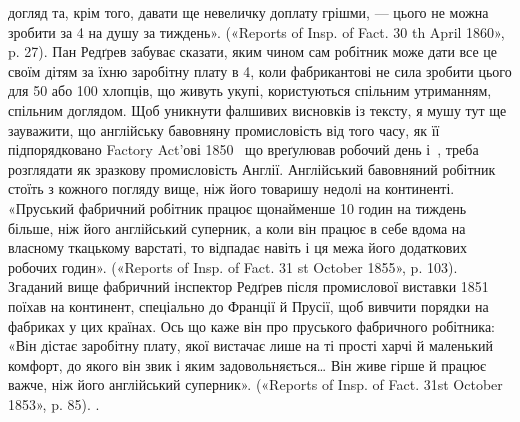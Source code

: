 {догляд та, крім того, давати ще невеличку доплату грішми, — цього
не можна зробити за 4 на душу за тиждень». («Reports of Insp.
of Fact. 30 th April 1860», p. 27). Пан Редґрев забуває сказати, яким
чином сам робітник може дати все це своїм дітям за їхню заробітну плату
в 4, коли фабрикантові не сила зробити цього для 50 або 100
хлопців, що живуть укупі, користуються спільним утриманням, спільним
доглядом. Щоб уникнути фалшивих висновків із тексту, я мушу тут ще
зауважити, що англійську бавовняну промисловість від того часу, як
її підпорядковано Factory Act’ові 1850~ що вреґулював робочий день
і~, треба розглядати як зразкову промисловість Англії. Англійський
бавовняний робітник стоїть з кожного погляду вище, ніж його товаришу
недолі на континенті. «Пруський фабричний робітник працює щонайменше
10 годин на тиждень більше, ніж його англійський суперник, а коли він
працює в себе вдома на власному ткацькому варстаті, то відпадає навіть
і ця межа його додаткових робочих годин». («Reports of Insp. of Fact.
31 st October 1855», p. 103). Згаданий вище фабричний інспектор Редґрев
після промислової виставки 1851~ поїхав на континент, спеціально до
Франції й Прусії, щоб вивчити порядки на фабриках у цих країнах.
Ось що каже він про пруського фабричного робітника: «Він дістає заробітну
плату, якої вистачає лише на ті прості харчі й маленький комфорт, до
якого він звик і яким задовольняється\dots{} Він живе гірше й працює важче,
ніж його англійський суперник». («Reports of Insp. of Fact. 31st October
1853», p. 85).
}.


